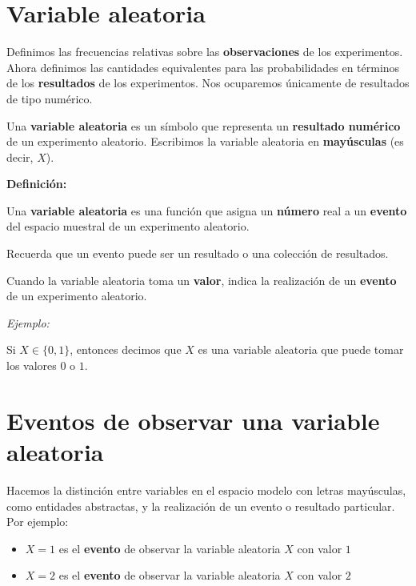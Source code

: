 \documentclass[
]{book}
\providecommand{\tightlist}{%
  \setlength{\itemsep}{0pt}\setlength{\parskip}{0pt}}
\begin{document}
\hypertarget{variable-aleatoria}{%
\section{Variable aleatoria}\label{variable-aleatoria}}

Definimos las frecuencias relativas sobre las \textbf{observaciones} de los experimentos. Ahora definimos las cantidades equivalentes para las probabilidades en términos de los \textbf{resultados} de los experimentos. Nos ocuparemos únicamente de resultados de tipo numérico.

Una \textbf{variable aleatoria} es un símbolo que representa un \textbf{resultado numérico} de un experimento aleatorio. Escribimos la variable aleatoria en \textbf{mayúsculas} (es decir, \(X\)).

\textbf{Definición:}

Una \textbf{variable aleatoria} es una función que asigna un \textbf{número} real a un \textbf{evento} del espacio muestral de un experimento aleatorio.

Recuerda que un evento puede ser un resultado o una colección de resultados.

Cuando la variable aleatoria toma un \textbf{valor}, indica la realización de un \textbf{evento} de un experimento aleatorio.

\emph{Ejemplo:}

Si \(X \in \{0,1\}\), entonces decimos que \(X\) es una variable aleatoria que puede tomar los valores \(0\) o \(1\).

\hypertarget{eventos-de-observar-una-variable-aleatoria}{%
\section{Eventos de observar una variable aleatoria}\label{eventos-de-observar-una-variable-aleatoria}}

Hacemos la distinción entre variables en el espacio modelo con letras mayúsculas, como entidades abstractas, y la realización de un evento o resultado particular. Por ejemplo:

\begin{itemize}
\tightlist
\item
  \(X=1\) es el \textbf{evento} de observar la variable aleatoria \(X\) con valor \(1\)
\item
  \(X=2\) es el \textbf{evento} de observar la variable aleatoria \(X\) con valor \(2\)
\end{itemize}
\end{document}
